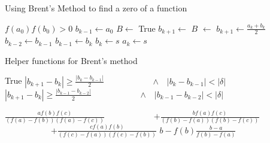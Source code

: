 \documentclass[twocolumn,12pt]{article}
\begin{document}
\begin{algorithm}[t]
  \caption{Using Brent's Method to find a zero of a function}
  \label{alg:brent}
  \begin{algorithmic}
    \Require $f(a_0)f(b_0) > 0$
        \State {}
      \EndIf
      \State $b_{k-1} \gets a_0$
      \State $B \gets$ True 
        \State {}
      \EndIf
      \State $b_{k+1} \gets$
      \State $B$ $\gets$ 
       
        \State $\displaystyle b_{k+1} \gets \frac{a_k+b_k}{2}$
      \EndIf
      \State $b_{k-2} \gets b_{k-1}$
      \State $b_{k-1} \gets b_k$
        \State $b_k \gets s$
      \Else
        \State $a_k \gets s$
      \EndIf
      \EndWhile
    \EndFunction
  \end{algorithmic}
\end{algorithm}
\begin{algorithm}[t!]
  \caption{Helper functions for Brent's method} \label{alg:bhelp}
  \begin{algorithmic}
    \State {}
    \State {}
    \State {}
      \State \Return True
      \State \Return
        $\displaystyle |b_{k+1}-b_k| \geq \frac{|b_k-b_{k-1}|}{2}$
      \State ~~~~~~~~~~~$\land$~~$|b_k-b_{k-1}| < |\delta|$
      \Else
      \State \Return $\displaystyle |b_{k+1}-b_k| \geq \frac{|b_{k-1}-b_{k-2}|}{2}$
      \State ~~~~~~~~~~~$\land$~~$|b_{k-1}-b_{k-2}| < |\delta|$
      \EndIf
    \EndFunction
  \end{algorithmic}
  \begin{algorithmic}
    \State {}
    \State {}
        \State \Return $\displaystyle \frac{af(b)f(c)}{(f(a)-f(b))(f(a)-f(c))}$
        \State ~~~~~~~~~~~$\displaystyle + \frac{bf(a)f(c)}{(f(b)-f(a))(f(b)-f(c))}$
        \State ~~~~~~~~~~~$\displaystyle + \frac{cf(a)f(b)}{(f(c)-f(a))(f(c)-f(b))}$
      \Else
        \State \Return $\displaystyle b - f(b)\frac{b-a}{f(b)-f(a)}$
      \EndIf
    \EndFunction
  \end{algorithmic}
\end{algorithm}
\end{document}

